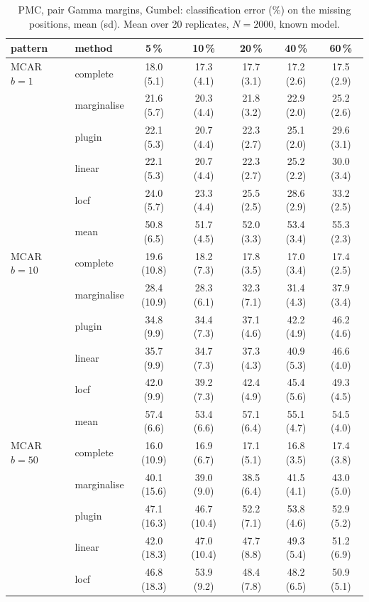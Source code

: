 \begin{table}[htbp]
  \centering
  \small
  \setlength{\tabcolsep}{4pt}
  \caption{PMC, pair Gamma margins, Gumbel: classification error (\%) on the missing positions, mean (sd). Mean over 20 replicates, $N = 2000$, known model.}
  \label{tab:missing-err-pmc_pair_gamma_gumbel_k2}
  \begin{tabular}{llccccc}
    \toprule
    pattern & method & 5\,\% & 10\,\% & 20\,\% & 40\,\% & 60\,\% \\
    \midrule
    MCAR $b{=}1$ & complete & 18.0 (5.1) & 17.3 (4.1) & 17.7 (3.1) & 17.2 (2.6) & 17.5 (2.9) \\
     & marginalise & 21.6 (5.7) & 20.3 (4.4) & 21.8 (3.2) & 22.9 (2.0) & 25.2 (2.6) \\
     & plugin & 22.1 (5.3) & 20.7 (4.4) & 22.3 (2.7) & 25.1 (2.0) & 29.6 (3.1) \\
     & linear & 22.1 (5.3) & 20.7 (4.4) & 22.3 (2.7) & 25.2 (2.2) & 30.0 (3.4) \\
     & locf & 24.0 (5.7) & 23.3 (4.4) & 25.5 (2.5) & 28.6 (2.9) & 33.2 (2.5) \\
     & mean & 50.8 (6.5) & 51.7 (4.5) & 52.0 (3.3) & 53.4 (3.4) & 55.3 (2.3) \\
    \addlinespace
    MCAR $b{=}10$ & complete & 19.6 (10.8) & 18.2 (7.3) & 17.8 (3.5) & 17.0 (3.4) & 17.4 (2.5) \\
     & marginalise & 28.4 (10.9) & 28.3 (6.1) & 32.3 (7.1) & 31.4 (4.3) & 37.9 (3.4) \\
     & plugin & 34.8 (9.9) & 34.4 (7.3) & 37.1 (4.6) & 42.2 (4.9) & 46.2 (4.6) \\
     & linear & 35.7 (9.9) & 34.7 (7.3) & 37.3 (4.3) & 40.9 (5.3) & 46.6 (4.0) \\
     & locf & 42.0 (9.9) & 39.2 (7.3) & 42.4 (4.9) & 45.4 (5.6) & 49.3 (4.5) \\
     & mean & 57.4 (6.6) & 53.4 (6.6) & 57.1 (6.4) & 55.1 (4.7) & 54.5 (4.0) \\
    \addlinespace
    MCAR $b{=}50$ & complete & 16.0 (10.9) & 16.9 (6.7) & 17.1 (5.1) & 16.8 (3.5) & 17.4 (3.8) \\
     & marginalise & 40.1 (15.6) & 39.0 (9.0) & 38.5 (6.4) & 41.5 (4.1) & 43.0 (5.0) \\
     & plugin & 47.1 (16.3) & 46.7 (10.4) & 52.2 (7.1) & 53.8 (4.6) & 52.9 (5.2) \\
     & linear & 42.0 (18.3) & 47.0 (10.4) & 47.7 (8.8) & 49.3 (5.4) & 51.2 (6.9) \\
     & locf & 46.8 (18.3) & 53.9 (9.2) & 48.4 (7.8) & 48.2 (6.5) & 50.9 (5.1) \\

\end{tabular}
\end{table}
